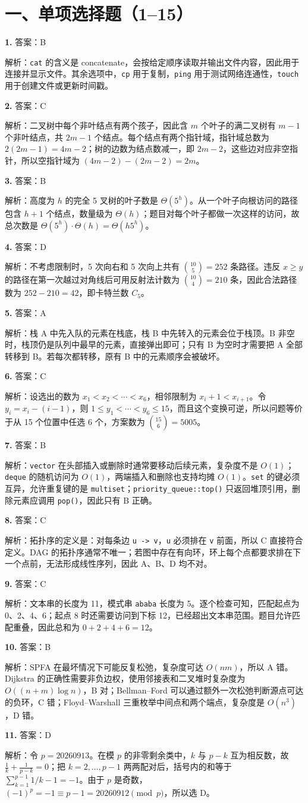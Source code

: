 \documentclass[a4paper]{ctexart}
\newcommand{\ans}[2]{\noindent\textbf{#1} \quad 答案：#2\par}
\newcommand{\expn}[1]{\hspace*{1.5em}解析：#1\par}
\begin{document}
\section*{一、单项选择题（1--15）}
\ans{1.}{B}\expn{\texttt{cat} 的含义是 concatenate，会按给定顺序读取并输出文件内容，因此用于连接并显示文件。其余选项中，\texttt{cp} 用于复制，\texttt{ping} 用于测试网络连通性，\texttt{touch} 用于创建文件或更新时间戳。}
\ans{2.}{C}\expn{二叉树中每个非叶结点有两个孩子，因此含 $m$ 个叶子的满二叉树有 $m-1$ 个非叶结点，共 $2m-1$ 个结点。每个结点有两个指针域，指针域总数为 $2(2m-1)=4m-2$；树的边数为结点数减一，即 $2m-2$，这些边对应非空指针，所以空指针域为 $(4m-2)-(2m-2)=2m$。}
\ans{3.}{B}\expn{高度为 $h$ 的完全 5 叉树的叶子数是 $\Theta(5^h)$。从一个叶子向根访问的路径包含 $h+1$ 个结点，数量级为 $\Theta(h)$；题目对每个叶子都做一次这样的访问，故总次数是 $\Theta(5^h)\cdot\Theta(h)=\Theta(h5^h)$。}
\ans{4.}{D}\expn{不考虑限制时，5 次向右和 5 次向上共有 $\binom{10}{5}=252$ 条路径。违反 $x\ge y$ 的路径在第一次越过对角线后可用反射法计数为 $\binom{10}{4}=210$ 条，因此合法路径数为 $252-210=42$，即卡特兰数 $C_5$。}
\ans{5.}{A}\expn{栈 A 中先入队的元素在栈底，栈 B 中先转入的元素会位于栈顶。B 非空时，栈顶仍是队列中最早的元素，直接弹出即可；只有 B 为空时才需要把 A 全部转移到 B。若每次都转移，原有 B 中的元素顺序会被破坏。}
\ans{6.}{C}\expn{设选出的数为 $x_1<x_2<\cdots<x_6$，相邻限制为 $x_i+1<x_{i+1}$。令 $y_i=x_i-(i-1)$，则 $1\le y_1<\cdots<y_6\le15$，而且这个变换可逆，所以问题等价于从 15 个位置中任选 6 个，方案数为 $\binom{15}{6}=5005$。}
\ans{7.}{B}\expn{\texttt{vector} 在头部插入或删除时通常要移动后续元素，复杂度不是 $O(1)$；\texttt{deque} 的随机访问为 $O(1)$，两端插入和删除也支持均摊 $O(1)$。\texttt{set} 的键必须互异，允许重复键的是 \texttt{multiset}；\texttt{priority\_queue::top()} 只返回堆顶引用，删除元素应调用 \texttt{pop()}，因此只有 B 正确。}
\ans{8.}{C}\expn{拓扑序的定义是：对每条边 \texttt{u -> v}，\texttt{u} 必须排在 \texttt{v} 前面，所以 C 直接符合定义。DAG 的拓扑序通常不唯一；若图中存在有向环，环上每个点都要求排在下一个点前，无法形成线性序列，因此 A、B、D 均不对。}
\ans{9.}{C}\expn{文本串的长度为 11，模式串 \texttt{ababa} 长度为 5。逐个检查可知，匹配起点为 0、2、4、6；起点 8 时还需要访问到下标 12，已经超出文本串范围。题目允许匹配重叠，因此总和为 $0+2+4+6=12$。}
\ans{10.}{B}\expn{SPFA 在最坏情况下可能反复松弛，复杂度可达 $O(nm)$，所以 A 错。Dijkstra 的正确性需要非负边权，使用邻接表和二叉堆时复杂度为 $O((n+m)\log n)$，B 对；Bellman--Ford 可以通过额外一次松弛判断源点可达的负环，C 错；Floyd--Warshall 三重枚举中间点和两个端点，复杂度是 $O(n^3)$，D 错。}
\ans{11.}{D}\expn{令 $p=20260913$。在模 $p$ 的非零剩余类中，$k$ 与 $p-k$ 互为相反数，故 $\frac1k+\frac1{p-k}=0$；把 $k=2,\ldots,p-1$ 两两配对后，括号内的和等于 $\sum_{k=1}^{p-1}1/k-1=-1$。由于 $p$ 是奇数，$(-1)^p=-1\equiv p-1=20260912\pmod p$，所以选 D。}
\end{document}
